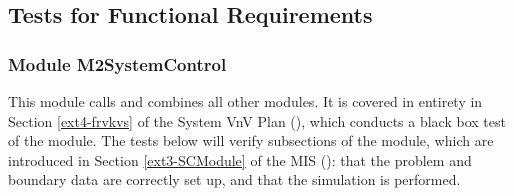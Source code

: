 \documentclass[12pt, titlepage]{article}
\begin{document}
\subsection{Tests for Functional Requirements}

\subsubsection{Module M2SystemControl}
\label{m2frtest}

This module calls and combines all other modules. It is covered in entirety in Section \ref{ext4-frvkvs} of the System VnV Plan (\citet{LBM_SVNV_PM}), which conducts a black box test of the module. The tests below will verify subsections of the module, which are introduced in Section \ref{ext3-SCModule} of the MIS (\citet{LBM_MIS_PM}): that the problem and boundary data are correctly set up, and that the simulation is performed.
\end{document}
